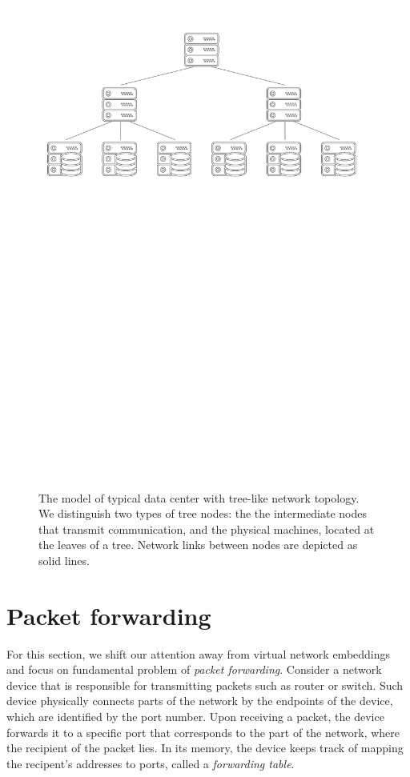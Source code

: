 \begin{figure}[h]
\centering
\includegraphics[width=0.79\columnwidth]{figs/tree-topology.pdf}
\caption{The model of typical data center with tree-like network topology. We distinguish two types of tree nodes: the the intermediate nodes that transmit communication, and the physical machines, located at the leaves of a tree. Network links between nodes are depicted as solid lines.}\label{fig:tree-topology}
\vspace{-1em}
\end{figure}

\section{Packet forwarding}
\label{sec:intro-packet-forwarding}

For this section, we shift our attention away from virtual network embeddings and focus on fundamental problem of \emph{packet forwarding}.
Consider a network device that is responsible for transmitting packets such as router or switch.
Such device physically connects parts of the network by the endpoints of the device, which are identified by the port number.
Upon receiving a packet, the device forwards it to a specific port that corresponds to the part of the network, where the recipient of the packet lies.
In its memory, the device keeps track of mapping the recipent's addresses to ports, called a \emph{forwarding table}.

